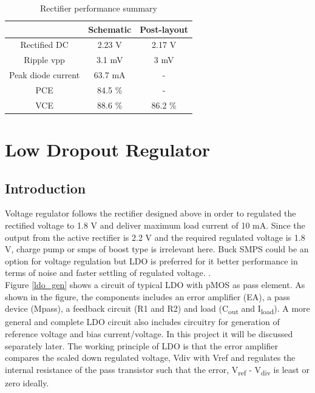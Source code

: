 \documentclass[UKenglish]{ifimaster}  %
\begin{document}
\begin{table}[H]
\caption{Rectifier performance summary}
\begin{center}
\begin{tabular}{c|c|c}
\hline \hline
				 & \textbf{Schematic}		& \textbf{Post-layout} \\
\hline \hline
Rectified DC	 	& 2.23 V 				& 2.17 V	\\ \hline
Ripple \acrshort{vpp} & 3.1 mV 				& 3 mV	\\ \hline
Peak diode current 	& 63.7 mA 			&	-	\\ \hline
PCE 				& 84.5 \% 				&	-	\\ \hline
VCE 				& 88.6 \% 				&	86.2 \%	\\
\hline \hline
\end{tabular}
\end{center}
\label{tab:rect_spec}
\end{table}


\chapter{Low Dropout Regulator}

\section{Introduction}		%

Voltage regulator follows the rectifier designed above in order to regulated the rectified voltage to 1.8 V and 
deliver maximum load current of 10 mA. Since the output from the active rectifier is 2.2 V and the required 
regulated voltage is 1.8 V, charge pump or  \acrshort{smps} of boost type is irrelevant here. Buck SMPS could be 
an option for voltage regulation but LDO is preferred for it better performance in terms of noise and faster 
settling of regulated voltage.  \cite{ldo_psu}.\\ 

Figure \ref{ldo_gen} shows a circuit of typical LDO with pMOS as pass element. As shown in the figure, the 
components includes an error amplifier (EA), a pass device (Mpass), a feedback circuit (R1 and R2) and load 
(C\textsubscript{out} and I\textsubscript{load}). A more general and complete LDO circuit also includes 
circuitry for generation of reference voltage and bias current/voltage. In this project it will be discussed 
separately later. The working principle of LDO is that the error amplifier compares the scaled down regulated 
voltage, Vdiv with Vref and regulates the internal resistance of the pass transistor such that  the error, 
V\textsubscript{ref} - V\textsubscript{div} is least or zero ideally. \\
\end{document}
